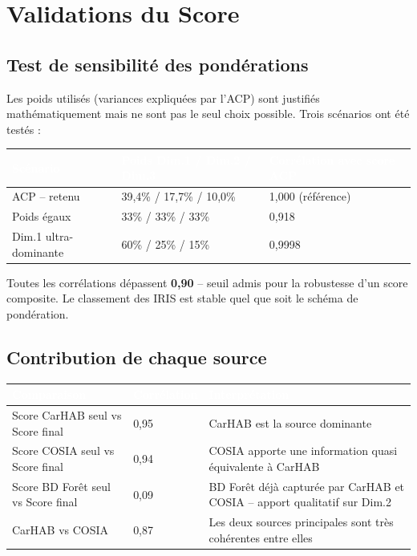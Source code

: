 \documentclass[11pt,a4paper]{report}
\begin{document}
\section{Validations du Score}

\subsection{Test de sensibilité des pondérations}

Les poids utilisés (variances expliquées par l'ACP) sont justifiés mathématiquement mais ne sont pas le seul choix possible. Trois scénarios ont été testés :

\vspace{0.3cm}
\begin{tabularx}{\textwidth}{L{3.5cm} L{4cm} X}
  \toprule
  \textcolor{white}{\textbf{Scénario}} &
  \textcolor{white}{\textbf{Poids Dim.1 / Dim.2 / Dim.3}} &
  \textcolor{white}{\textbf{Corrélation avec score ACP}} \\
  \midrule
  ACP -- retenu & 39,4\% / 17,7\% / 10,0\% & 1,000 (référence) \\
  Poids égaux & 33\% / 33\% / 33\% & 0,918 \\
  Dim.1 ultra-dominante & 60\% / 25\% / 15\% & 0,9998 \\
  \bottomrule
\end{tabularx}

\vspace{0.3cm}
Toutes les corrélations dépassent \textbf{0,90} -- seuil admis pour la robustesse d'un score composite. Le classement des IRIS est stable quel que soit le schéma de pondération.

\subsection{Contribution de chaque source}

\begin{tabularx}{\textwidth}{L{4.5cm} L{1.8cm} X}
  \toprule
  \textcolor{white}{\textbf{Comparaison}} &
  \textcolor{white}{\textbf{Corrélation}} &
  \textcolor{white}{\textbf{Interprétation}} \\
  \midrule
  Score CarHAB seul vs Score final & 0,95 & CarHAB est la source dominante \\
  Score COSIA seul vs Score final & 0,94 & COSIA apporte une information quasi équivalente à CarHAB \\
  Score BD Forêt seul vs Score final & 0,09 & BD Forêt déjà capturée par CarHAB et COSIA -- apport qualitatif sur Dim.2 \\
  CarHAB vs COSIA & 0,87 & Les deux sources principales sont très cohérentes entre elles \\
  \bottomrule
\end{tabularx}
\end{document}
